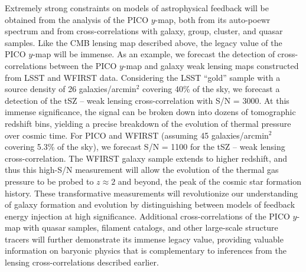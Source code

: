 \documentclass[PICOReport.tex]{subfiles}
\begin{document}
Extremely strong constraints on models of astrophysical feedback will be obtained from the analysis of the PICO $y$-map, both from its auto-poewr spectrum and from cross-correlations with galaxy, group, cluster, and quasar samples.  Like the CMB lensing map described above, the legacy value of the PICO $y$-map will be immense.  As an example, we forecast the detection of cross-correlations between the PICO $y$-map and galaxy weak lensing maps constructed from LSST and WFIRST data.  Considering the LSST ``gold'' sample with a source density of 26 galaxies/arcmin${}^2$ covering 40\% of the sky, we forecast a detection of the tSZ -- weak lensing cross-correlation with S/N = 3000.  At this immense significance, the signal can be broken down into dozens of tomographic redshift bins, yielding a precise breakdown of the evolution of thermal pressure over cosmic time.  For PICO and WFIRST (assuming 45 galaxies/arcmin${}^2$ covering 5.3\% of the sky), we forecast S/N = 1100 for the tSZ -- weak lensing cross-correlation.  The WFIRST galaxy sample extends to higher redshift, and thus this high-S/N measurement will allow the evolution of the thermal gas pressure to be probed to $z \approx 2$ and beyond, the peak of the cosmic star formation history.  These transformative measurements will revolutionize our understanding of galaxy formation and evolution by distinguishing between models of feedback energy injection at high significance.  Additional cross-correlations of the PICO $y$-map with quasar samples, filament catalogs, and other large-scale structure tracers will further demonstrate its immense legacy value, providing valuable information on baryonic physics that is complementary to inferences from the lensing cross-correlations described earlier. %
\end{document}
